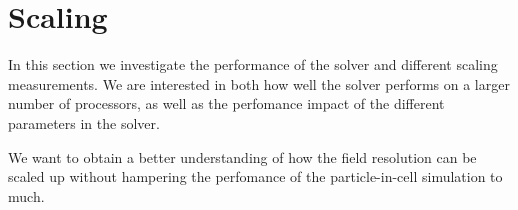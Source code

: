 \section{Scaling}
  In this section we investigate the performance of the solver and different scaling
  measurements. We are interested in both how well the solver performs on a larger
  number of processors, as well as the perfomance impact of the different
  parameters in the solver.

  We want to obtain a better understanding of how the field resolution can be scaled
  up without hampering the perfomance of the particle-in-cell simulation to much.

  
